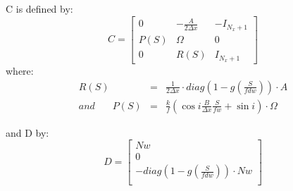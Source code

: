 \documentclass[
journal=jacsat, %
manuscript=article]{achemso}
\begin{document}
C is defined by:
\begin{equation}
C=
\left[
\begin{array}{c|c|c}
0 & -\frac{A}{2 \Delta x}  & -I_{N_{x}+1}  \\
\hline
P(S) & \Omega & 0 \\
\hline
0 & R(S) & I_{N_{x}+1}
\end{array}
\right]
\end{equation}
where:
\begin{equation}
\begin{array}{rcl}
     R(S) & = &  \frac{1}{2 \Delta x} \cdot diag(1-g(\frac{S}{fdw}))\cdot A\\
     and \: \: \: \: \: \: \: \: P(S) & = & \frac{k}{f}(\cos i \frac{B}{\Delta x}\frac{S}{fw}+\sin i) \cdot \Omega
\end{array}
\end{equation}

and D by:
\begin{equation}
    D=
    \begin{bmatrix}
        Nw\\
        0 \\
        -diag(1-g(\frac{S}{fdw}))\cdot Nw \\
    \end{bmatrix}
\end{equation}



\end{document}
